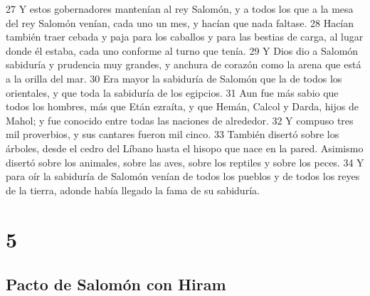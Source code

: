 27 Y estos gobernadores mantenían al rey Salomón, y a todos los que a la mesa del rey Salomón venían, cada uno un mes, y hacían que nada faltase.
28 Hacían también traer cebada y paja para los caballos y para las bestias de carga, al lugar donde él estaba, cada uno conforme al turno que tenía.
29 Y Dios dio a Salomón sabiduría y prudencia muy grandes, y anchura de corazón como la arena que está a la orilla del mar.
30 Era mayor la sabiduría de Salomón que la de todos los orientales, y que toda la sabiduría de los egipcios.
31 Aun fue más sabio que todos los hombres, más que Etán ezraíta, y que Hemán, Calcol y Darda, hijos de Mahol; y fue conocido entre todas las naciones de alrededor.
32 Y compuso tres mil proverbios, y sus cantares fueron mil cinco. 
33 También disertó sobre los árboles, desde el cedro del Líbano hasta el hisopo que nace en la pared. Asimismo disertó sobre los animales, sobre las aves, sobre los reptiles y sobre los peces.
34 Y para oír la sabiduría de Salomón venían de todos los pueblos y de todos los reyes de la tierra, adonde había llegado la fama de su sabiduría.

\chapter{5}

\section*{Pacto de Salomón con Hiram}

 

